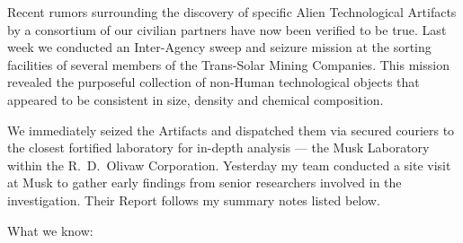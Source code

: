 \documentclass[letterpaper,10pt]{texMemo} %
\begin{document}
\maketitle %
\noindent Recent rumors surrounding the discovery of specific Alien Technological Artifacts by a consortium of our civilian partners have now been verified to be true. Last week we conducted an Inter-Agency sweep and seizure mission at the sorting facilities of several members of the Trans-Solar Mining Companies. This mission revealed the purposeful collection of non-Human technological objects that appeared to be consistent in size, density and chemical composition.

\noindent We immediately seized the Artifacts and dispatched them via secured couriers to the closest fortified laboratory for in-depth analysis --- the Musk Laboratory within the R.~D.~Olivaw Corporation. Yesterday my team conducted a site visit at Musk to gather early findings from senior researchers involved in the investigation. Their Report follows my summary notes listed below.

\bigskip
\noindent What we know:
\end{document}
